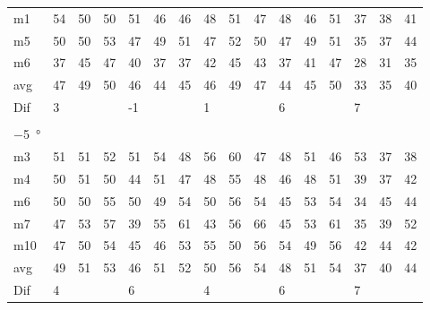 \begin{table}[H]
\begin{tabular}{l|l|l|l|l|l|l|l|l|l|l|l|l|lll}
m1    & 54     &   50   &    50  &  51    &  46    &  46    &  48    &    51   &  47    &  48     & 46     &  51    & \multicolumn{1}{l|}{37} & \multicolumn{1}{l|}{38} & 41 \\
m5    &  50    &   50   &   53   &  47    &   49   &  51    &   47   &   52    &  50    &  47     &  49    &  51    & \multicolumn{1}{l|}{35} & \multicolumn{1}{l|}{37} & 44 \\
m6    &  37    &   45   &   47   &   40   &   37   &  37    &  42    &   45    &   43   &   37    &  41    &   47   & \multicolumn{1}{l|}{28} & \multicolumn{1}{l|}{31} & 35 \\ \hline
avg   &  47    &  49    &  50    &  46    &   44   &   45   &  46    &  49     &  47    &  44     &  45    &   50   & \multicolumn{1}{l|}{33} & \multicolumn{1}{l|}{35}  &  40 \\ \hline 
Dif & \multicolumn{3}{l|}{3} & \multicolumn{3}{l|}{-1} & \multicolumn{3}{l|}{1} & \multicolumn{3}{l|}{6} & \multicolumn{3}{l}{7} \\ 
 \multicolumn{16}{l}{ } \\   
\SI{-5}{\degree}   & \multicolumn{3}{l|}{} & \multicolumn{3}{l|}{} & \multicolumn{3}{l|}{} & \multicolumn{3}{l|}{} & \multicolumn{3}{l}{}   \\  \hline
m3    & 51     & 51     &   52   &   51   &   54   &  48    &  56    &   60    &  47    &   48    &  51    &  46    & \multicolumn{1}{l|}{53} & \multicolumn{1}{l|}{37} & 38 \\
m4    &  50    &  51    &  50    &  44    &   51   &  47    &  48    &  55     &   48   &   46    &  48    &   51   & \multicolumn{1}{l|}{39} & \multicolumn{1}{l|}{37} & 42 \\
m6    &  50    &  50    &   55   &   50   &   49   &  54    &  50    &   56    &   54   &   45    & 53     &  54    & \multicolumn{1}{l|}{34} & \multicolumn{1}{l|}{45} & 44 \\
m7    &  47    &  53    &  57    &   39   &   55   &  61    &  43    &   56    &   66   &   45    &   53   &  61    & \multicolumn{1}{l|}{35} & \multicolumn{1}{l|}{39} &  52\\
m10  &  47    &   50   &   54   &   45   &   46   &  53    &  55    &   50    &   56   &  54     &   49   &   56   & \multicolumn{1}{l|}{42} & \multicolumn{1}{l|}{44} &  42\\ \hline
avg   &   49   &   51   & 53     &   46   &    51  & 52     &  50    &   56    &   54   &   48    &   51   &  54    & \multicolumn{1}{l|}{37} & \multicolumn{1}{l|}{40}  & 44  \\ \hline 
Dif & \multicolumn{3}{l|}{4} & \multicolumn{3}{l|}{6} & \multicolumn{3}{l|}{4} & \multicolumn{3}{l|}{6} & \multicolumn{3}{l}{7}    
\end{tabular}
\end{table}



